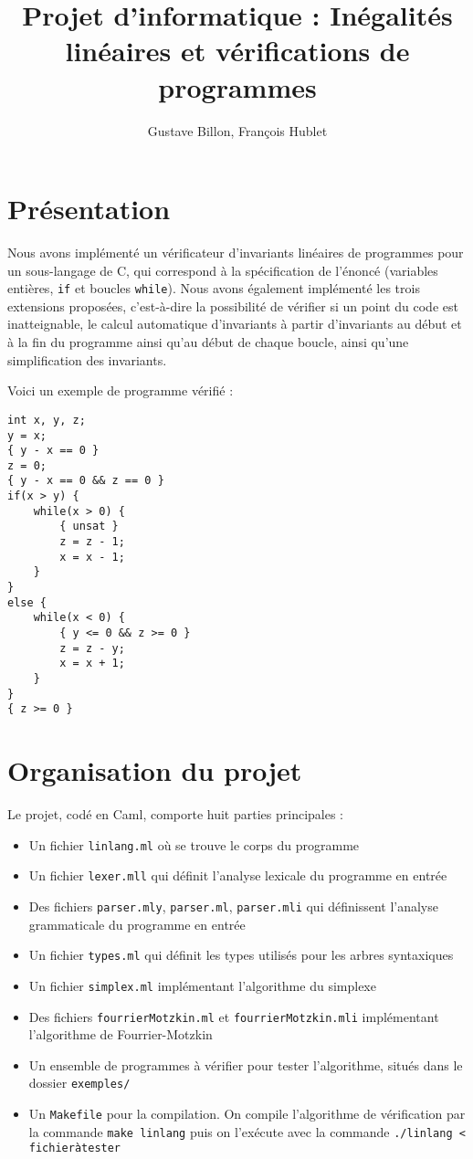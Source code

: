 \documentclass[a4paper]{article}
\title{Projet d'informatique : Inégalités linéaires et vérifications de programmes}
\author{Gustave Billon, François Hublet}
\begin{document}
\maketitle


\section{Présentation}

Nous avons implémenté un vérificateur d'invariants linéaires de programmes pour un sous-langage de C, qui correspond à la spécification de l'énoncé (variables entières, \texttt{if} et boucles \texttt{while}). Nous avons également implémenté les trois extensions proposées, c'est-à-dire la possibilité de vérifier si un point du code est inatteignable, le calcul automatique d'invariants à partir d'invariants au début et à la fin du programme ainsi qu'au début de chaque boucle, ainsi qu'une simplification des invariants.

Voici un exemple de programme vérifié :

\begin{lstlisting}
int x, y, z;
y = x;
{ y - x == 0 }
z = 0;
{ y - x == 0 && z == 0 }
if(x > y) {
	while(x > 0) {
		{ unsat }
		z = z - 1;
		x = x - 1;
	}
}
else {
	while(x < 0) {
		{ y <= 0 && z >= 0 }
		z = z - y;
		x = x + 1;
	}
}
{ z >= 0 }
\end{lstlisting}

\section{Organisation du projet}

Le projet, codé en Caml, comporte huit parties principales :

\begin{itemize}
  \item Un fichier \texttt{linlang.ml} où se trouve le corps du programme
  \item Un fichier \texttt{lexer.mll} qui définit l'analyse lexicale du programme en entrée
  \item Des fichiers \texttt{parser.mly}, \texttt{parser.ml}, \texttt{parser.mli} qui définissent l'analyse grammaticale du programme en entrée
  \item Un fichier \texttt{types.ml} qui définit les types utilisés pour les arbres syntaxiques
  \item Un fichier \texttt{simplex.ml} implémentant l'algorithme du simplexe
  \item Des fichiers \texttt{fourrierMotzkin.ml} et \texttt{fourrierMotzkin.mli} implémentant l'algorithme de Fourrier-Motzkin
  \item Un ensemble de programmes à vérifier pour tester l'algorithme, situés dans le dossier \texttt{exemples/}
  \item Un \texttt{Makefile} pour la compilation. On compile l'algorithme de vérification par la commande \texttt{make linlang} puis on l'exécute avec la commande \texttt{./linlang < fichier\textunderscore à\textunderscore tester}

\end{itemize}
\end{document}
